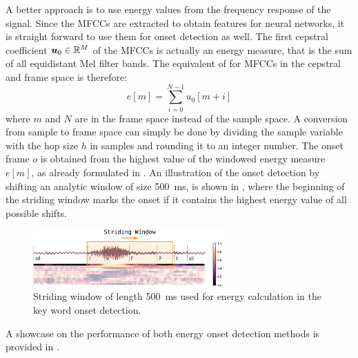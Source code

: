 A better approach is to use energy values from the frequency response of the signal.
Since the MFCCs are extracted to obtain features for neural networks, it is straight forward to use them for onset detection as well.
The first cepstral coefficient $\bm{u}_0 \in \mathbb{R}^M$ of the MFCCs is actually an energy measure, that is the sum of all equidistant Mel filter bands.
The equivalent of  for MFCCs in the cepstral and frame space is therefore:
\begin{equation}
  e[m] = \sum_{i=0}^{N-1} u_0[m + i]
\end{equation}
where $m$ and $N$ are in the frame space instead of the sample space.
A conversion from sample to frame space can simply be done by dividing the sample variable with the hop size $h$ in samples and rounding it to an integer number.
The onset frame $o$ is obtained from the highest value of the windowed energy measure $e[m]$, as already formulated in .
An illustration of the onset detection by shifting an analytic window of size \SI{500}{\milli\second}, is shown in , where
the beginning of the striding window marks the onset if it contains the highest energy value of all possible shifts.
\begin{figure}[!ht]
  \centering
    \includegraphics[width=0.65\textwidth]{./3_signal/figs/signal_onset_window.pdf}
  \caption{Striding window of length \SI{500}{\milli\second} used for energy calculation in the key word onset detection.}
  \label{fig:signal_onset_window}
\end{figure}
\FloatBarrier
\noindent
A showcase on the performance of both energy onset detection methods is provided in .
